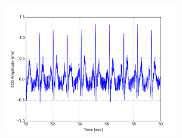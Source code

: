 \documentclass[paper=a4, fontsize=11pt]{scrartcl}
\numberwithin{equation}{section}		%
\numberwithin{figure}{section}			%
\numberwithin{table}{section}		    %
\begin{document}
\begin{appendices}
\begin{figure}[H]
\begin{subfigure}[b]{0.3\textwidth}
		\includegraphics[width=\textwidth]{sim/ecg_6}
	\end{subfigure}
\end{figure}


\end{appendices}
\end{document}
